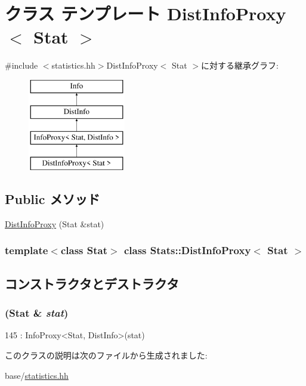 \hypertarget{classStats_1_1DistInfoProxy}{
\section{クラス テンプレート DistInfoProxy$<$ Stat $>$}
\label{classStats_1_1DistInfoProxy}
}


{\ttfamily \#include $<$statistics.hh$>$}DistInfoProxy$<$ Stat $>$に対する継承グラフ:\begin{figure}[H]
\begin{center}
\leavevmode
\includegraphics[height=4cm]{classStats_1_1DistInfoProxy}
\end{center}
\end{figure}
\subsection*{Public メソッド}
\begin{DoxyCompactItemize}
\item 
\hyperlink{classStats_1_1DistInfoProxy_ac45896abdb011af1eb51df80432c3743}{DistInfoProxy} (Stat \&stat)
\end{DoxyCompactItemize}
\subsubsection*{template$<$class Stat$>$ class Stats::DistInfoProxy$<$ Stat $>$}



\subsection{コンストラクタとデストラクタ}
\hypertarget{classStats_1_1DistInfoProxy_ac45896abdb011af1eb51df80432c3743}{
\subsubsection[{DistInfoProxy}]{ (Stat \& {\em stat})}}
\label{classStats_1_1DistInfoProxy_ac45896abdb011af1eb51df80432c3743}



\begin{DoxyCode}
145 : InfoProxy<Stat, DistInfo>(stat) {}
\end{DoxyCode}


このクラスの説明は次のファイルから生成されました:\begin{DoxyCompactItemize}
\item 
base/\hyperlink{statistics_8hh}{statistics.hh}\end{DoxyCompactItemize}
